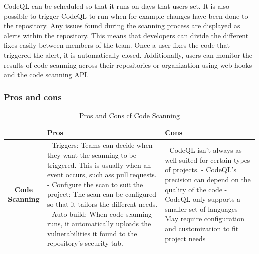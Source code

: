 CodeQL can be scheduled so that it runs on days that users set. It is also possible to trigger CodeQL to run when for example changes have been done to the repository.
Any issues found during the scanning process are displayed as alerts within the repository. This means that developers can divide the different fixes easily between members of the team.  Once a user fixes the code that triggered the alert, it is automatically closed. Additionally, users can monitor the results of code scanning across their repositories or organization using web-hooks and the code scanning API. 
\cite{GithubCodeScanning}

\subsubsection{Pros and cons}
\begin{table}[H]
\centering
\begin{tabular}{|c|p{6cm}|p{6cm}|}
\hline
 & \textbf{Pros} & \textbf{Cons} \\
\hline
\textbf{Code Scanning} & 
- Triggers: Teams can decide when they want the scanning to be triggered. This is usually when an event occurs, such ass pull requests.  \newline
- Configure the scan to suit the project: The scan can be configured so that it tailors the 
  different needs. \newline
- Auto-build: When code scanning runs, it automatically uploads the vulnerabilities it found to the repository's security tab. &
- CodeQL isn't always as well-suited for certain types of projects. \newline
- CodeQL's precision can depend on the quality of the code\newline
- CodeQL only supports a smaller set of languages \newline
- May require configuration and customization to fit project needs \\
\hline
\end{tabular}
\caption{Pros and Cons of Code Scanning}
\label{tab: Code Scanning}
\end{table}


